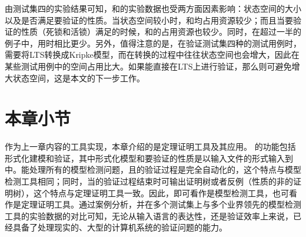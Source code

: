 由测试集四的实验结果可知，\sctlprov{}和\CADP{}的实验数据也受两方面因素影响：状态空间的大小以及是否满足要验证的性质。当状态空间较小时，\sctlprov{}和\CADP{}均占用资源较少；而且当要验证的性质（死锁和活锁）满足的时候，\sctlprov{}和\CADP{}的占用资源也较少。同时，在超过一半的例子中，\sctlprov{}用时相比\CADP{}更少。另外，值得注意的是，在验证测试集四种的测试用例时，\sctlprov{}需要将\textsf{LTS}转换成Kripke模型，而在转换的过程中往往状态空间也会增大，因此在某些测试用例中\sctlprov{}的空间占用比\CADP{}大。如果\sctlprov{}能直接在\textsf{LTS}上进行验证，那么则可避免增大状态空间，这是本文的下一步工作。

\section{本章小节}
作为上一章内容的工具实现，本章介绍的是定理证明工具\sctlprov{}及其应用。\sctlprov{} 的功能包括形式化建模和验证，其中形式化模型和要验证的性质是以输入文件的形式输入到\sctlprov{}中。\sctlprov{}能处理所有的\CTL{}模型检测问题，且的验证过程是完全自动化的，这个特点与模型检测工具相同；同时，当\sctlprov{}的验证过程结束时可输出证明树或者反例（性质的非的证明树），这个特点与定理证明工具一致。因此，\sctlprov{}即可看作是模型检测工具，也可看作是定理证明工具。通过案例分析，并在多个测试集上与多个业界领先的模型检测工具的实验数据的对比可知，无论从输入语言的表达性，还是验证效率上来说，\sctlprov{}已经具备了处理现实的、大型的计算机系统的验证问题的能力。

